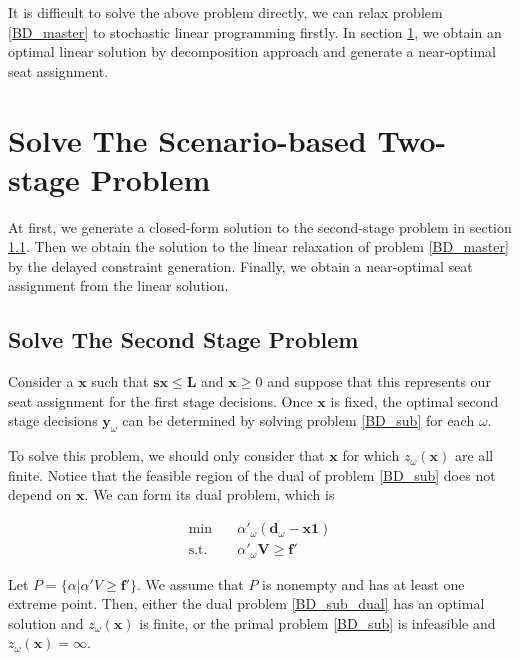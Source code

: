 It is difficult to solve the above problem directly, we can relax problem \eqref{BD_master} to stochastic linear programming firstly. In section \ref{solve_by_benders}, we obtain an optimal linear solution by decomposition approach and generate a near-optimal seat assignment.

\section{Solve The Scenario-based Two-stage Problem}\label{solve_by_benders}

At first, we generate a closed-form solution to the second-stage problem in section \ref{second_stage}. Then we obtain the solution to the linear relaxation of problem \eqref{BD_master} by the delayed constraint generation. Finally, we obtain a near-optimal seat assignment from the linear solution.


\subsection{Solve The Second Stage Problem}\label{second_stage}

Consider a $\mathbf{x}$ such that $\mathbf{s x} \leq \mathbf{L}$ and $\mathbf{x} \geq 0$ and suppose that this represents our seat assignment for the first stage decisions. Once $\mathbf{x}$ is fixed, the optimal second stage decisions $\mathbf{y}_{\omega}$ can be determined by solving problem \eqref{BD_sub} for each $\omega$.

To solve this problem, we should only consider that $\mathbf{x}$ for which $z_{\omega}(\mathbf{x})$ are all finite. Notice that the feasible region of the dual of problem \eqref{BD_sub} does not depend on $\mathbf{x}$. We can form its dual problem, which is 

\begin{equation}\label{BD_sub_dual}
  \begin{aligned}
    \min \quad & \alpha{'}_{\omega} (\mathbf{d}_{\omega}- \mathbf{x} \mathbf{1}) \\
    \text {s.t.} \quad & \alpha{'}_{\omega} \mathbf{V} \geq \mathbf{f}{'}
  \end{aligned}
  \end{equation}

Let $P = \{\alpha|\alpha{'}V \geq \mathbf{f}{'}\}$. 
We assume that $P$ is nonempty and has at least one extreme point. Then, either the dual problem \eqref{BD_sub_dual} has an optimal solution and $z_{\omega}(\mathbf{x})$ is finite, or the primal problem \eqref{BD_sub} is infeasible and $z_{\omega}(\mathbf{x}) = \infty$.  

